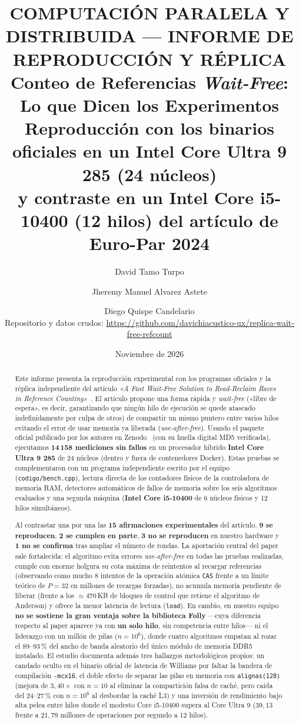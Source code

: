 \documentclass[11pt,a4paper]{article}
\title{%
  {\small\color{acento}\textbf{COMPUTACIÓN PARALELA Y DISTRIBUIDA --- INFORME DE REPRODUCCIÓN Y RÉPLICA}}\\[4pt]
  \textbf{\LARGE Conteo de Referencias \emph{Wait-Free}: Lo que Dicen los Experimentos}\\[6pt]
  {\large Reproducción con los binarios oficiales en un Intel Core Ultra 9 285 (24 núcleos)\\
  y contraste en un Intel Core i5-10400 (12 hilos) del artículo de Euro-Par 2024}
}
\author{%
  David Tamo Turpo \and Jheremy Manuel Alvarez Astete \and Diego Quispe Candelario\\[4pt]
  {\small Repositorio y datos crudos: \url{https://github.com/davichiacustico-ux/replica-wait-free-refcount}}
}
\date{Noviembre de 2026}
\begin{document}
\maketitle

\begin{abstract}
\noindent
Este informe presenta la reproducción experimental con los programas oficiales y la réplica independiente del artículo \emph{«A Fast Wait-Free Solution to Read-Reclaim Races in Reference Counting»}~\cite{dewolff2024waitfree}. El artículo propone una forma rápida y \emph{wait-free} («libre de espera», es decir, garantizando que ningún hilo de ejecución se quede atascado indefinidamente por culpa de otros) de compartir un mismo puntero entre varios hilos evitando el error de usar memoria ya liberada (\emph{use-after-free}). Usando el paquete oficial publicado por los autores en Zenodo~\cite{dewolff2024artifact} (con su huella digital MD5 verificada), ejecutamos \textbf{14\,158 mediciones sin fallos} en un procesador híbrido \textbf{Intel Core Ultra 9 285} de 24 núcleos (dentro y fuera de contenedores Docker). Estas pruebas se complementaron con un programa independiente escrito por el equipo (\texttt{codigo/bench.cpp}), lectura directa de los contadores físicos de la controladora de memoria RAM, detectores automáticos de fallos de memoria sobre los seis algoritmos evaluados y una segunda máquina (\textbf{Intel Core i5-10400} de 6 núcleos físicos y 12 hilos simultáneos).

Al contrastar una por una las \textbf{15 afirmaciones experimentales} del artículo, \textbf{9 se reproducen}, \textbf{2 se cumplen en parte}, \textbf{3 no se reproducen} en nuestro hardware y \textbf{1 no se confirma} tras ampliar el número de rondas. La aportación central del paper sale fortalecida: el algoritmo evita errores \emph{use-after-free} en todas las pruebas realizadas, cumple con enorme holgura su cota máxima de reintentos al recargar referencias (observando como mucho 8 intentos de la operación atómica \texttt{CAS} frente a un límite teórico de $P = 32$ en millones de recargas forzadas), no acumula memoria pendiente de liberar (frente a los $\approx 470$\,KB de bloques de control que retiene el algoritmo de Anderson) y ofrece la menor latencia de lectura (\texttt{load}). En cambio, en nuestro equipo \textbf{no se sostiene la gran ventaja sobre la biblioteca Folly} —cuya diferencia respecto al paper aparece ya con \textbf{un solo hilo}, sin competencia entre hilos— ni el liderazgo con un millón de pilas ($n = 10^6$), donde cuatro algoritmos empatan al rozar el 89--93\,\% del ancho de banda aleatorio del único módulo de memoria DDR5 instalado. El estudio documenta además tres hallazgos metodológicos propios: un candado oculto en el binario oficial de latencia de Williams por faltar la bandera de compilación \texttt{-mcx16}, el doble efecto de separar las pilas en memoria con \texttt{alignas(128)} (mejora de $3,40\times$ con $n = 10$ al eliminar la compartición falsa de caché, pero caída del 24--27\,\% con $n = 10^6$ al desbordar la caché L3) y una inversión de rendimiento bajo alta pelea entre hilos donde el modesto Core i5-10400 supera al Core Ultra 9 ($39,13$ frente a $21,79$ millones de operaciones por segundo a 12 hilos).
\end{abstract}
\end{document}

